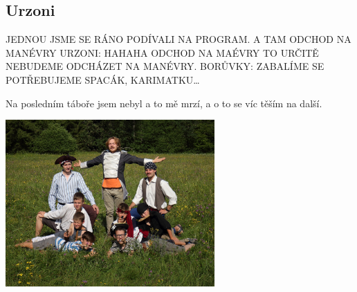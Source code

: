 \subsection*{Urzoni} %
\label{sub:urzoni}

\begin{multicols}{2}
	

JEDNOU JSME SE RÁNO PODÍVALI NA PROGRAM. A TAM ODCHOD NA MANÉVRY URZONI: HAHAHA ODCHOD NA MAÉVRY TO URČITĚ NEBUDEME ODCHÁZET NA MANÉVRY. BORŮVKY: ZABALÍME SE POTŘEBUJEME SPACÁK, KARIMATKU…


\columnbreak

Na posledním táboře jsem nebyl a to mě mrzí, a o to se víc těším na další.


\end{multicols}
\begin{center}

\includegraphics[width=8cm]{img/druziny/urzoni.JPG}

\end{center}

\clearpage


